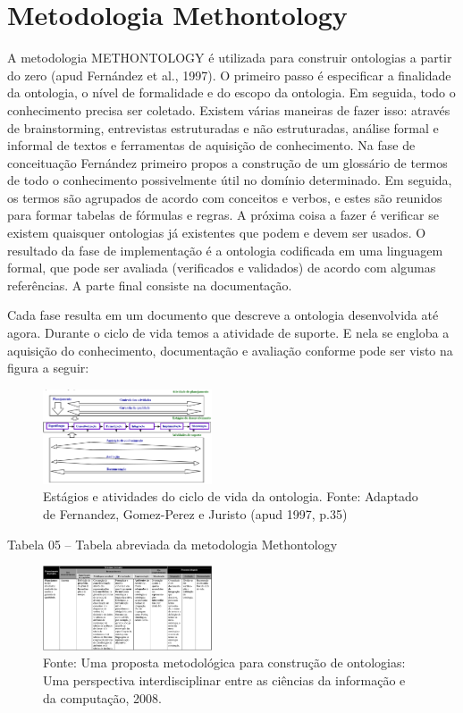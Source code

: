 \documentclass[a4paper]{report}
\begin{document}
\section{Metodologia Methontology} 
\qquad A metodologia METHONTOLOGY é utilizada para construir ontologias a partir do zero (apud Fernández et al., 1997). O primeiro passo é especificar a finalidade da ontologia, o nível de formalidade e do escopo da ontologia. Em seguida, todo o conhecimento precisa ser coletado. Existem várias maneiras de fazer isso: através de brainstorming, entrevistas estruturadas e não estruturadas, análise formal e informal de textos e ferramentas de aquisição de conhecimento. Na fase de conceituação Fernández  primeiro propos a construção de um glossário de termos de todo o conhecimento possivelmente útil no domínio determinado. Em seguida, os termos são agrupados de acordo com conceitos e verbos, e estes são reunidos para formar tabelas de fórmulas e regras. A próxima coisa a fazer é verificar se existem quaisquer ontologias já existentes que podem e devem ser usados. O resultado da fase de implementação é a ontologia codificada em uma linguagem formal, que pode ser avaliada (verificados e validados) de acordo com algumas referências. A parte final consiste na documentação. 
 
Cada fase resulta em um documento que descreve a ontologia desenvolvida até agora. Durante o ciclo de vida temos a atividade de suporte. E nela se engloba a aquisição do conhecimento, documentação e avaliação conforme pode ser visto na figura a seguir:

\begin{figure}[h] 
\centering %
\includegraphics[width=5cm]{Figuras/8.png} %
\caption{Estágios e atividades do ciclo de vida da ontologia.
Fonte: Adaptado de Fernandez, Gomez-Perez e Juristo (apud 1997, p.35)}
\end{figure}

Tabela 05 – Tabela abreviada da metodologia Methontology

\begin{figure}[h] 
\centering %
\includegraphics[width=5cm]{Figuras/9.png} %
\caption{Fonte: Uma proposta metodológica para construção de ontologias: Uma perspectiva interdisciplinar entre as ciências da informação e da computação, 2008.}
\end{figure}
\end{document}
